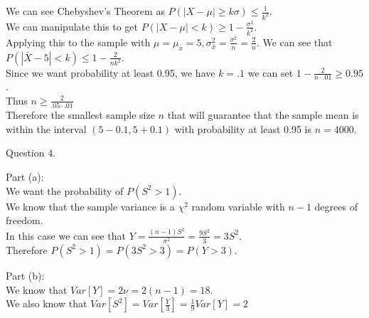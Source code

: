 \documentclass[answers,12pt,addpoints]{exam}
\begin{document}
\begin{questions}
    \begin{solution}
        We can see Chebyshev's Theorem as $P(|X - \mu| \geq k\sigma) \leq \frac{1}{k^2}$. \\
        We can manipulate this to get $P(|X - \mu| < k) \geq 1 - \frac{\sigma^2}{k^2}$.\\
        Applying this to the sample with $\mu = \mu_{\bar{x}} =  5, \sigma_{\bar{x}}^2 = \frac{\sigma^2}{n} = \frac{2}{n}$. We can see that $P(|\bar{X} - 5| < k) \leq 1 - \frac{2}{nk^2}$.\\
        Since we want probability at least 0.95, we have $k=.1$ we can set $1 - \frac{2}{n \cdot .01} \geq 0.95$.\\
        Thus $n \geq \frac{2}{.05 \cdot .01}$\\
        Therefore the smallest sample size $n$ that will guarantee that the sample mean is within the interval $(5 - 0.1, 5 + 0.1)$ with probability at least 0.95 is $n = 4000$.\\
    \end{solution}
    

    \question Question 4.
    \begin{solution}
        Part (a):\\
        We want the probability of $P(S^2 > 1)$. \\
        We know that the sample variance is a $\chi^2$ random variable with $n-1$ degrees of freedom. \\
        In this case we can see that $Y = \frac{(n-1)S^2}{\sigma^2} = \frac{9S^2}{3} = 3S^2$.\\
        Therefore $P(S^2 > 1) = P(3S^2 > 3) = P(Y > 3)$.\\
    \end{solution}
    \begin{solution}
        Part (b):\\
        We know that $Var[Y] = 2\nu = 2(n-1) = 18$.\\
        We also know that $Var[S^2] = Var[\frac{Y}{3}] = \frac{1}{9}Var[Y] = 2$
    \end{solution}


\end{questions}
\end{document}
